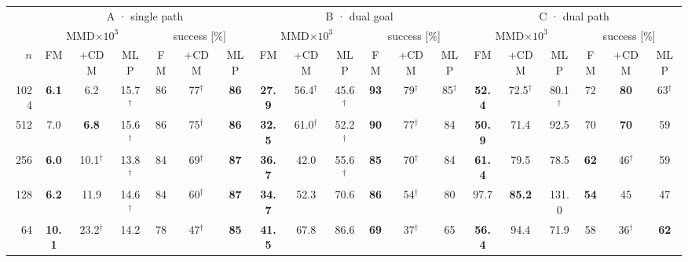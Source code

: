 \begin{tabular}{rcccccccccccccccccc}
\toprule
 & \multicolumn{6}{c}{A · single path} & \multicolumn{6}{c}{B · dual goal} & \multicolumn{6}{c}{C · dual path} \\
\cmidrule(lr){2-7}\cmidrule(lr){8-13}\cmidrule(lr){14-19}
 & \multicolumn{3}{c}{MMD$\times10^3$} & \multicolumn{3}{c}{success [\%]} & \multicolumn{3}{c}{MMD$\times10^3$} & \multicolumn{3}{c}{success [\%]} & \multicolumn{3}{c}{MMD$\times10^3$} & \multicolumn{3}{c}{success [\%]} \\
$n$ & FM & +CDM & MLP & FM & +CDM & MLP & FM & +CDM & MLP & FM & +CDM & MLP & FM & +CDM & MLP & FM & +CDM & MLP \\
\midrule
1024 & \textbf{6.1} & 6.2 & 15.7$^\dagger$ & 86 & 77$^\dagger$ & \textbf{86} & \textbf{27.9} & 56.4$^\dagger$ & 45.6$^\dagger$ & \textbf{93} & 79$^\dagger$ & 85$^\dagger$ & \textbf{52.4} & 72.5$^\dagger$ & 80.1$^\dagger$ & 72 & \textbf{80} & 63$^\dagger$ \\
512 & 7.0 & \textbf{6.8} & 15.6$^\dagger$ & 86 & 75$^\dagger$ & \textbf{86} & \textbf{32.5} & 61.0$^\dagger$ & 52.2$^\dagger$ & \textbf{90} & 77$^\dagger$ & 84 & \textbf{50.9} & 71.4 & 92.5 & 70 & \textbf{70} & 59 \\
256 & \textbf{6.0} & 10.1$^\dagger$ & 13.8$^\dagger$ & 84 & 69$^\dagger$ & \textbf{87} & \textbf{36.7} & 42.0 & 55.6$^\dagger$ & \textbf{85} & 70$^\dagger$ & 84 & \textbf{61.4} & 79.5 & 78.5 & \textbf{62} & 46$^\dagger$ & 59 \\
128 & \textbf{6.2} & 11.9 & 14.6$^\dagger$ & 84 & 60$^\dagger$ & \textbf{87} & \textbf{34.7} & 52.3 & 70.6 & \textbf{86} & 54$^\dagger$ & 80 & 97.7 & \textbf{85.2} & 131.0 & \textbf{54} & 45 & 47 \\
64 & \textbf{10.1} & 23.2$^\dagger$ & 14.2 & 78 & 47$^\dagger$ & \textbf{85} & \textbf{41.5} & 67.8 & 86.6 & \textbf{69} & 37$^\dagger$ & 65 & \textbf{56.4} & 94.4 & 71.9 & 58 & 36$^\dagger$ & \textbf{62} \\
\bottomrule
\end{tabular}
